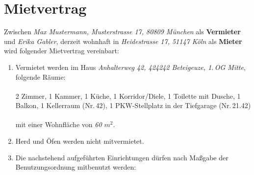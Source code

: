 \documentclass{scrreprt}[12pt,a4paper,twoside,duplex]
\newcommand{\vermieter}{\textcolor{zuBearbeiten}{Max Mustermann}}
\newcommand{\vermieterAddresse}{\textcolor{zuBearbeiten}{Musterstrasse 17, 80809 M\"unchen}}
\newcommand{\mieter}{\textcolor{zuBearbeiten}{Erika Gabler}}
\newcommand{\mieterAdresse}{\textcolor{zuBearbeiten}{Heidestrasse 17, 51147 K\"oln}}
\newcommand{\mietObjekt}{\textcolor{zuBearbeiten}{\textsl{Anhalterweg 42, 424242 Beteigeuze, 1.\,OG Mitte}}}
\begin{document}
\chapter*{Mietvertrag}

Zwischen \textsl{\vermieter, \vermieterAddresse} als \textbf{Vermieter} und
\textsl{\mieter}, derzeit wohnhaft in \textsl{\mieterAdresse} als
\textbf{Mieter} wird folgender Mietvertrag vereinbart:

\begin{contract}
\label{mietsache:Raeume}

\begin{enumerate}
  \item Vermietet werden im Haus \mietObjekt, folgende Räume:
\\\\
\textcolor{zuBearbeiten}{2 Zimmer, 1 Kammer, 1 Küche, 1 Korridor/Diele, 1 Toilette mit Dusche, 1 Balkon,
1 Kellerraum (Nr.\,42), 1 PKW-Stellplatz in der Tiefgarage (Nr.\,21.42)
\\\\
mit einer Wohnfläche von \textsl{60 $m^2$}}.
\item Herd und Öfen werden nicht mitvermietet.
\item Die nachstehend aufgeführten Einrichtungen dürfen nach Maßgabe der
Benutzungsordnung mitbenutzt werden:


\end{enumerate}
\end{contract}
\end{document}
